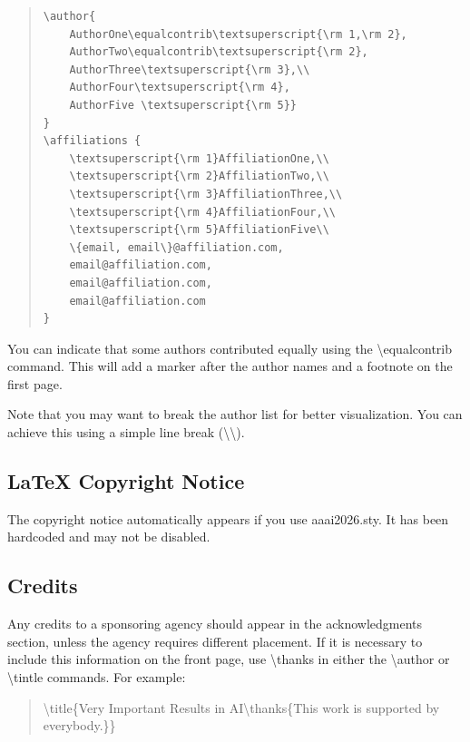 \begin{quote}\begin{scriptsize}\begin{verbatim}
\author{
    AuthorOne\equalcontrib\textsuperscript{\rm 1,\rm 2},
    AuthorTwo\equalcontrib\textsuperscript{\rm 2},
    AuthorThree\textsuperscript{\rm 3},\\
    AuthorFour\textsuperscript{\rm 4},
    AuthorFive \textsuperscript{\rm 5}}
}
\affiliations {
    \textsuperscript{\rm 1}AffiliationOne,\\
    \textsuperscript{\rm 2}AffiliationTwo,\\
    \textsuperscript{\rm 3}AffiliationThree,\\
    \textsuperscript{\rm 4}AffiliationFour,\\
    \textsuperscript{\rm 5}AffiliationFive\\
    \{email, email\}@affiliation.com,
    email@affiliation.com,
    email@affiliation.com,
    email@affiliation.com
}
\end{verbatim}\end{scriptsize}\end{quote}

You can indicate that some authors contributed equally using the
\textbackslash equalcontrib command. This will add a marker after the
author names and a footnote on the first page.

Note that you may want to break the author list for better
visualization. You can achieve this using a simple line break
(\textbackslash  \textbackslash).

\subsection{\LaTeX{} Copyright Notice}

The copyright notice automatically appears if you use aaai2026.sty. It
has been hardcoded and may not be disabled.

\subsection{Credits}

Any credits to a sponsoring agency should appear in the acknowledgments
section, unless the agency requires different placement. If it is
necessary to include this information on the front page, use
\textbackslash thanks in either the \textbackslash author or
\textbackslash tintle commands. For example:

\begin{quote}
\begin{small}
\textbackslash title\{Very Important Results in AI\textbackslash thanks\{This work is
 supported by everybody.\}\}
\end{small}
\end{quote}

